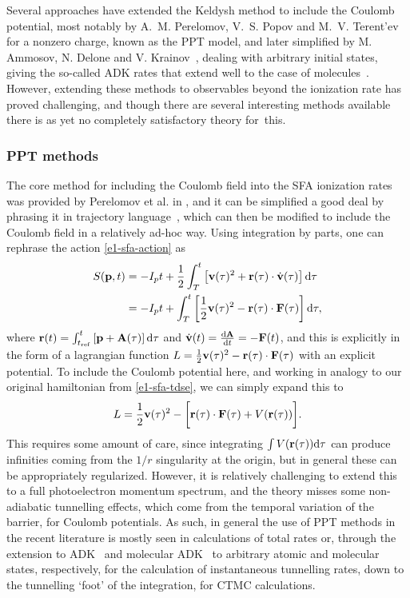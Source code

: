 Several approaches have extended the Keldysh method to include the Coulomb potential, most notably by A.~M. Perelomov, V.~S. Popov and M.~V. Terent'ev~\cite{perelomov_ionization_1966, perelomov_ionization-II_1967, perelomov_ionization-III_1967} for a nonzero charge, known as the PPT model, and later simplified by M. Ammosov, N. Delone and V. Krainov~\cite{ammosov-delone-krainov-1986}, dealing with arbitrary initial states, giving the so-called ADK rates that extend well to the case of molecules~\cite{tong_mo-adk_2002}. However, extending these methods to observables beyond the ionization rate has proved challenging, and though there are several interesting methods available there is as yet no completely satisfactory theory for~this.




\subsubsection{PPT methods}
The core method for including the Coulomb field into the SFA ionization rates was provided by Perelomov et al. in , and it can be simplified a good deal by phrasing it in trajectory language~, which can then be modified to include the Coulomb field in a relatively ad-hoc way. Using integration by parts, one can rephrase the action \eqref{e1-sfa-action} as
\begin{align}
S(\vb{p},t) 
&=
-I_p t+\frac 12 \int_{T}^{t} \left[\vb{v}(\tau)^2 + \vb{r}(\tau)\cdot \dot{\vb{v}}(\tau) \right] \mathrm{d}\tau
\nonumber \\ &=
-I_p t + \int_{T}^{t} \left[\frac 12 \vb{v}(\tau)^2 - \vb{r}(\tau)\cdot \vb{F}(\tau) \right] \mathrm{d}\tau
,
\label{e1-sfa-action-lagrangian}
\end{align}
where $\vb{r}(t)=\int_{t_\mathrm{ref}}^{t}\left[ \vb{p}+\vb{A}(\tau)\right] \mathrm{d}\tau$ and $\dot{\vb{v}}(t) = \frac{\mathrm{d}\vb{A}}{\mathrm{d} t} =-\vb{F}(t)$, and this is explicitly in the form of a lagrangian function $L=\frac 12 \vb{v}(\tau)^2 - \vb{r}(\tau)\cdot \vb{F}(\tau)$ with an explicit potential. To include the Coulomb potential here, and working in analogy to our original hamiltonian from \eqref{e1-sfa-tdse}, we can simply expand this to
\begin{equation}
L=\frac 12 \vb{v}(\tau)^2 - \bigg[ \vb{r}(\tau)\cdot \vb{F}(\tau) +V(\vb{r}(\tau)) \bigg].
\end{equation}
This requires some amount of care, since integrating $\int V(\vb{r}(\tau))\mathrm{d}\tau$ can produce infinities coming from the $1/r$ singularity at the origin, but in general these can be appropriately regularized. However, it is relatively challenging to extend this to a full photoelectron momentum spectrum, and the theory misses some non-adiabatic tunnelling effects, which come from the temporal variation of the barrier, for Coulomb potentials. As such, in general the use of PPT methods in the recent literature is mostly seen in calculations of total rates or, through the extension to ADK~\cite{ammosov-delone-krainov-1986} and molecular ADK~\cite{tong_mo-adk_2002} to arbitrary atomic and molecular states, respectively, for the calculation of instantaneous tunnelling rates, down to the tunnelling `foot' of the integration, for CTMC calculations. 



